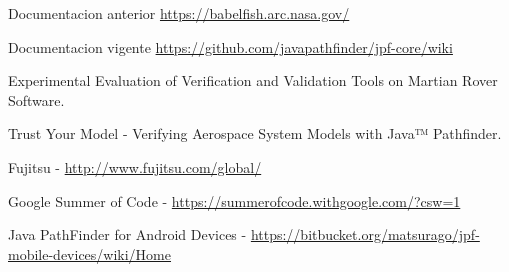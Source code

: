 \documentclass[runningheads]{llncs}
\begin{document}
%
%
%
% 
% 
%
\begin{thebibliography}{8}
Documentacion anterior \url{https://babelfish.arc.nasa.gov/}

Documentacion vigente \url{https://github.com/javapathfinder/jpf-core/wiki}

Experimental Evaluation of Verification and Validation Tools on Martian Rover Software.

Trust Your Model - Verifying Aerospace System Models with Java™ Pathfinder.

Fujitsu - \url{http://www.fujitsu.com/global/}

Google Summer of Code - \url{https://summerofcode.withgoogle.com/?csw=1}

Java PathFinder for Android Devices - \url{https://bitbucket.org/matsurago/jpf-mobile-devices/wiki/Home}

\end{thebibliography}
\end{document}

